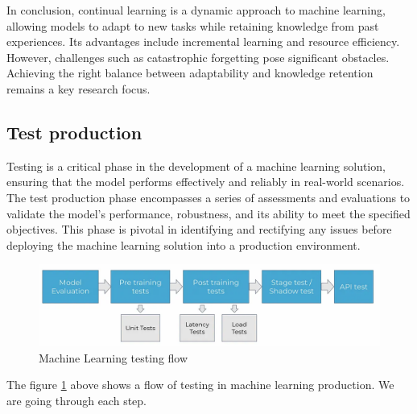 \documentclass[12pt,a4paper]{article}
\begin{document}
In conclusion, continual learning is a dynamic approach to machine learning, allowing models to adapt to new tasks while retaining knowledge from past experiences. Its advantages include incremental learning and resource efficiency. However, challenges such as catastrophic forgetting pose significant obstacles. Achieving the right balance between adaptability and knowledge retention remains a key research focus.


\subsection{Test production}

Testing is a critical phase in the development of a machine learning solution, ensuring that the model performs effectively and reliably in real-world scenarios. The test production phase encompasses a series of assessments and evaluations to validate the model's performance, robustness, and its ability to meet the specified objectives. This phase is pivotal in identifying and rectifying any issues before deploying the machine learning solution into a production environment.

\begin{figure}[!htb]
	\centering
	\includegraphics[width=0.65\linewidth]{assets/test-flow}
	\caption{Machine Learning testing flow \cite{test}}
	\label{fig:test-flow}
\end{figure}

The figure \ref{fig:test-flow} above shows a flow of testing in machine learning production. We are going through each step. 
\end{document}
